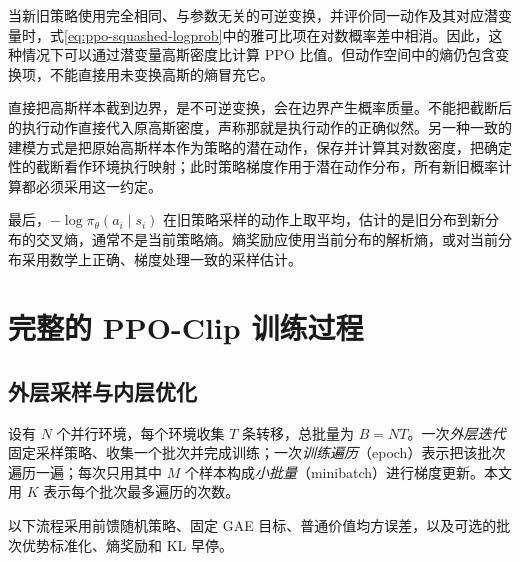 \documentclass[UTF8,12pt,a4paper,fontset=fandol]{ctexart}
\begin{document}
当新旧策略使用完全相同、与参数无关的可逆变换，并评价同一动作及其对应潜变量时，式\eqref{eq:ppo-squashed-logprob}中的雅可比项在对数概率差中相消。因此，这种情况下可以通过潜变量高斯密度比计算 PPO 比值。但动作空间中的熵仍包含变换项，不能直接用未变换高斯的熵冒充它。

直接把高斯样本截到边界，是不可逆变换，会在边界产生概率质量。不能把截断后的执行动作直接代入原高斯密度，声称那就是执行动作的正确似然。另一种一致的建模方式是把原始高斯样本作为策略的潜在动作，保存并计算其对数密度，把确定性的截断看作环境执行映射；此时策略梯度作用于潜在动作分布，所有新旧概率计算都必须采用这一约定。

最后，$-\log\pi_\theta(a_i\mid s_i)$ 在旧策略采样的动作上取平均，估计的是旧分布到新分布的交叉熵，通常不是当前策略熵。熵奖励应使用当前分布的解析熵，或对当前分布采用数学上正确、梯度处理一致的采样估计。

\section{完整的 PPO-Clip 训练过程}
\label{sec:ppo-algorithm}

\subsection{外层采样与内层优化}

设有 $N$ 个并行环境，每个环境收集 $T$ 条转移，总批量为 $B=NT$。一次\emph{外层迭代}固定采样策略、收集一个批次并完成训练；一次\emph{训练遍历}（epoch）表示把该批次遍历一遍；每次只用其中 $M$ 个样本构成\emph{小批量}（minibatch）进行梯度更新。本文用 $K$ 表示每个批次最多遍历的次数。

以下流程采用前馈随机策略、固定 GAE 目标、普通价值均方误差，以及可选的批次优势标准化、熵奖励和 KL 早停。
\end{document}
